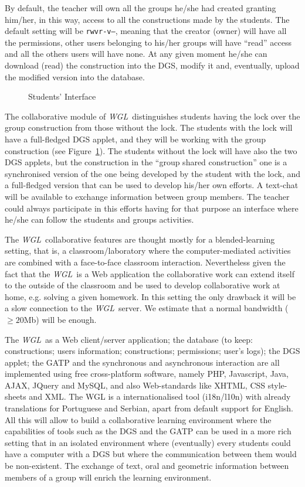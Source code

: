 \documentclass{llncs}
\newcommand{\WGL}{{\em WGL}}
\begin{document}
By default, the teacher will own all the groups he/she had created
granting him/her, in this way, access to all the constructions made by
the students. The default setting will be {\tt rwvr-v---}, meaning
that the creator (owner) will have all the permissions, other users
belonging to his/her groups will have ``read'' access and all the
others users will have none. At any given moment he/she can download
(read) the construction into the DGS, modify it and, eventually,
upload the modified version into the database.

\begin{figure}[hbtp]  
  \caption{Students' Interface}
  \label{fig:withlock}
\end{figure}

The collaborative module of \WGL\ distinguishes students having the
lock over the group construction from those without the lock. The
students with the lock will have a full-fledged DGS applet, and they
will be working with the group construction (see
Figure~\ref{fig:withlock}). The students without the lock will have
also the two DGS applets, but the construction in the ``group shared
construction'' one is a synchronised version of the one being
developed by the student with the lock, and a full-fledged version
that can be used to develop his/her own efforts. A text-chat will be
available to exchange information between group members. The teacher
could always participate in this efforts having for that purpose an
interface where he/she can follow the students and groups activities.

The \WGL\ collaborative features are thought mostly for a
blended-learning setting, that is, a classroom/laboratory where the
computer-mediated activities are combined with a face-to-face
classroom interaction. Nevertheless given the fact that the \WGL\ is a
Web application the collaborative work can extend itself to the
outside of the classroom and be used to develop collaborative work at
home, e.g. solving a given homework. In this setting the only drawback
it will be a slow connection to the \WGL\ server. We estimate that a
normal bandwidth ($\geq 20$Mb) will be enough.

The \WGL\ as a Web client/server application; the database (to keep:
constructions; users information; constructions; permissions; user's
logs); the DGS applet; the GATP and the synchronous and asynchronous
interaction are all implemented using free cross-platform software,
namely PHP, Javascript, Java, AJAX, JQuery and MySQL, and also
Web-standards like XHTML, CSS style-sheets and XML. The WGL is a
internationalised tool (i18n/l10n) with already translations for
Portuguese and Serbian, apart from default support for English. All
this will allow to build a collaborative learning environment where
the capabilities of tools such as the DGS and the GATP can be used in
a more rich setting that in an isolated environment where (eventually)
every students could have a computer with a DGS but where the
communication between them would be non-existent. The exchange of
text, oral and geometric information between members of a group will
enrich the learning environment.
\end{document}
